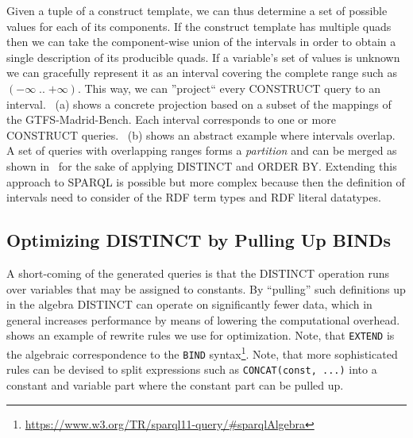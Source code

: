 Given a tuple of a construct template, we can thus determine a set of possible values for each of its components.
If the construct template has multiple quads then we can take the component-wise union of the intervals in order to obtain a single description of its producible quads.
If a variable's set of values is unknown we can gracefully represent it as an interval covering the complete range such as $({-\infty}\; .. \; {+\infty})$.
This way, we can ''project`` every CONSTRUCT query to an interval. ~(a) shows a concrete projection based on a subset of the mappings of the GTFS-Madrid-Bench. Each interval corresponds to one or more CONSTRUCT queries.
~(b) shows an abstract example where intervals overlap.
A set of queries with overlapping ranges forms a \emph{partition} and can be merged as shown in~ for the sake of applying DISTINCT and ORDER BY.
Extending this approach to SPARQL is possible but more complex because then the definition of intervals need to consider of the RDF term types and RDF literal datatypes.

\subsection{Optimizing DISTINCT by Pulling Up BINDs}
A short-coming of the generated queries is that the DISTINCT operation runs over variables that may be assigned to constants.
By ``pulling'' such definitions up in the algebra DISTINCT can operate on significantly fewer data, which in general increases performance by means of lowering the computational overhead.  shows an example of rewrite rules we use for optimization. Note, that \texttt{EXTEND} is the algebraic correspondence to the \texttt{BIND} syntax\footnote{\url{https://www.w3.org/TR/sparql11-query/\#sparqlAlgebra}}.
Note, that more sophisticated rules can be devised to split expressions such as \lstinline{CONCAT(const, ...)} into a constant and variable part where the constant part can be pulled up.

